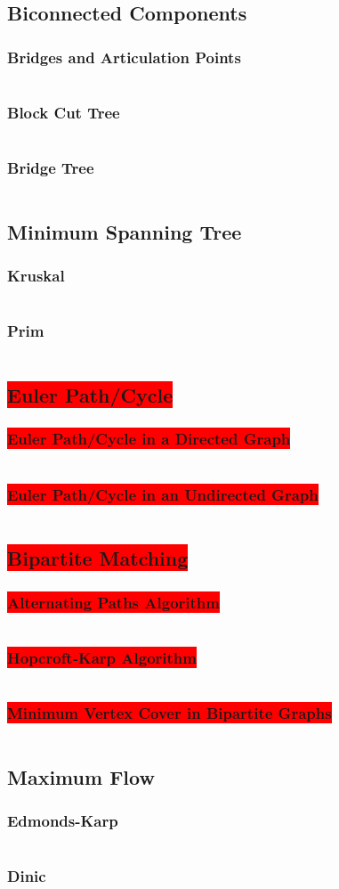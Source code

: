 \documentclass[8pt,a4paper,landscape,oneside]{amsart}
\newcommand{\code}[1]{\inputminted[fontsize=\normalsize,baselinestretch=1]{cpp}{_code/#1}}
\newcommand{\subsectionRed}[1]{\subsection{\colorbox{red}{\color{white}#1}}}
\newcommand{\subsubsectionRed}[1]{\subsubsection{\colorbox{red}{\color{white}#1}}}
\begin{document}
\begin{multicols*}{3}
	\subsection{Biconnected Components}
	  \subsubsection{Bridges and Articulation Points}
      \code{graphs/bcc/bridges_artics.cpp}
    \subsubsection{Block Cut Tree}
      \code{graphs/bcc/block_cut_tree.cpp}
		\subsubsection{Bridge Tree}
      \code{graphs/bcc/bridge_tree.cpp}
	\subsection{Minimum Spanning Tree}
		\subsubsection{Kruskal}
      \code{graphs/mst/kruskal.cpp}
		\subsubsection{Prim}
      \code{graphs/mst/prim.cpp}
	\subsectionRed{Euler Path/Cycle}
    \subsubsectionRed{Euler Path/Cycle in a Directed Graph}
      \code{graphs/euler_path.cpp}
    \subsubsectionRed{Euler Path/Cycle in an Undirected Graph}
      \code{graphs/euler_path_undirected.cpp}
	\subsectionRed{Bipartite Matching}
		\subsubsectionRed{Alternating Paths Algorithm}
      \code{graphs/bipartite_matching/bipartite_matching.cpp}
		\subsubsectionRed{Hopcroft-Karp Algorithm}
      \code{graphs/bipartite_matching/hopcroft_karp.cpp}
    \subsubsectionRed{Minimum Vertex Cover in Bipartite Graphs}
      \code{graphs/bipartite_matching/bipartite_mvc.cpp}
	\subsection{Maximum Flow}
		\subsubsection{Edmonds-Karp}
			\code{graphs/max_flow/edmonds_karp.cpp}
		\subsubsection{Dinic}
			\code{graphs/max_flow/dinic.cpp}

\end{multicols*}
\end{document}
